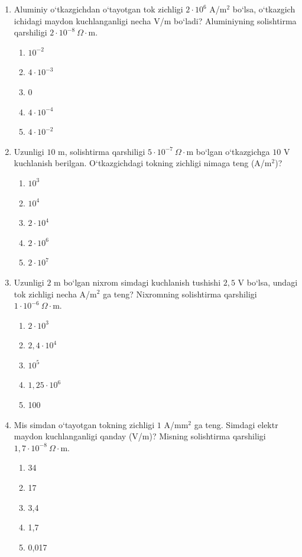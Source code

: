 \begin{enumerate}
\item Aluminiy o‘tkazgichdan o‘tayotgan tok zichligi $2\cdot10^6$ A/m$^2$ bo‘lsa, o‘tkazgich ichidagi maydon kuchlanganligi necha V/m bo‘ladi? Aluminiyning solishtirma qarshiligi $2\cdot10^{-8}~\Omega\cdot$m.
\begin{enumerate}[label=\Alph*)]
\item $10^{-2}$
\item $4\cdot10^{-3}$
\item 0
\item $4\cdot10^{-4}$
\item $4\cdot10^{-2}$
\end{enumerate}

\item Uzunligi $10$ m, solishtirma qarshiligi $5\cdot10^{-7}~\Omega\cdot$m bo‘lgan o‘tkazgichga $10$ V kuchlanish berilgan. O‘tkazgichdagi tokning zichligi nimaga teng (A/m$^2$)?
\begin{enumerate}[label=\Alph*)]
\item $10^3$
\item $10^4$
\item $2\cdot10^4$
\item $2\cdot10^6$
\item $2\cdot10^7$
\end{enumerate}

\item Uzunligi $2$ m bo‘lgan nixrom simdagi kuchlanish tushishi $2,5$ V bo‘lsa, undagi tok zichligi necha A/m$^2$ ga teng? Nixromning solishtirma qarshiligi $1\cdot10^{-6}~\Omega\cdot$m.
\begin{enumerate}[label=\Alph*)]
\item $2\cdot10^3$
\item $2,4\cdot10^4$
\item $10^5$
\item $1,25\cdot10^6$
\item 100
\end{enumerate}

\item Mis simdan o‘tayotgan tokning zichligi $1$ A/mm$^2$ ga teng. Simdagi elektr maydon kuchlanganligi qanday (V/m)? Misning solishtirma qarshiligi $1,7\cdot10^{-8}~\Omega\cdot$m.
\begin{enumerate}[label=\Alph*)]
\item 34
\item 17
\item 3,4
\item 1,7
\item 0,017
\end{enumerate}


\end{enumerate}
